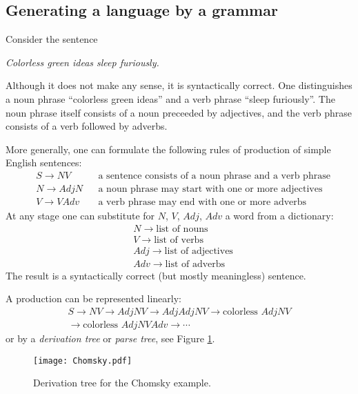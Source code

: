 \begin{page}
\setcounter{section}{5}
\setcounter{subsection}{1}
\setcounter{dfn}{0}
\label{portion:1207}

\subsection{Generating a language by a grammar}
\label{sec:LangGram}
Consider the sentence
\begin{center}
\emph{Colorless green ideas sleep furiously.}
\end{center}
Although it does not make any sense, it is syntactically correct.
One distinguishes a noun phrase ``colorless green ideas'' and a verb phrase ``sleep furiously''.
The noun phrase itself consists of a noun preceeded by adjectives, and the verb phrase consists of a verb followed by adverbs.

More generally, one can formulate the following rules of production of simple English sentences:
\begin{align*}
&S \to NV &&\text{a sentence consists of a noun phrase and a verb phrase}\\
&N \to AdjN &&\text{a noun phrase may start with one or more adjectives}\\
&V \to VAdv &&\text{a verb phrase may end with one or more adverbs}
\end{align*}
At any stage one can substitute for $N$, $V$, $Adj$, $Adv$ a word from a dictionary:
\begin{align*}
&N \to \text{list of nouns}\\
&V \to \text{list of verbs}\\
&Adj \to \text{list of adjectives}\\
&Adv \to \text{list of adverbs}
\end{align*}
The result is a syntactically correct (but mostly meaningless) sentence.

A production can be represented linearly:
\begin{multline*}
S \to NV \to AdjNV \to AdjAdjNV \to \text{colorless }AdjNV\\
\to \text{colorless }AdjNVAdv \to \cdots 
\end{multline*}
or by a \emph{derivation tree} or \emph{parse tree}, see Figure \ref{fig:Chomsky}.

\begin{figure}[ht]
\begin{center}
\texttt{[image: Chomsky.pdf]}
\end{center}
\caption{Derivation tree for the Chomsky example.}
\label{fig:Chomsky}
\end{figure}


\end{page}
